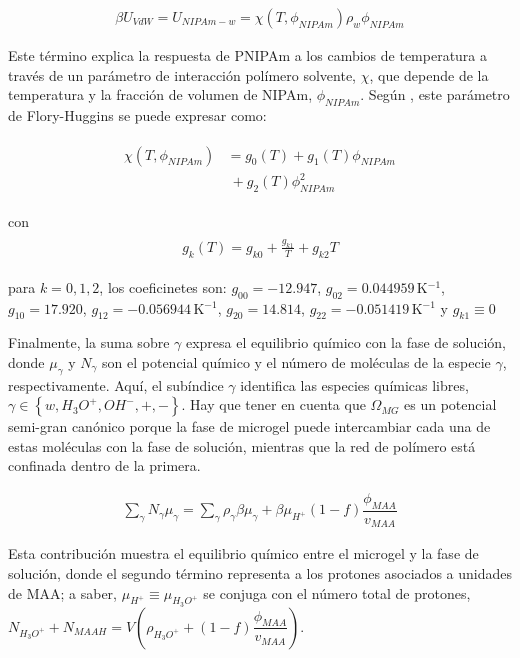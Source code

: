 \begin{align}
	\beta U_{VdW} = U_{NIPAm-w} = \chi (T, \phi_{NIPAm})\rho_w \phi_{NIPAm}
\end{align}


Este  t\'ermino explica la respuesta de PNIPAm a los cambios de temperatura a trav\'es de un par\'ametro de interacci\'on pol\'imero solvente, $\chi$, que depende de la temperatura y la fracci\'on de volumen de NIPAm, $\phi_{NIPAm}$.
Seg\'un  \citet{afroze2000}, este par\'ametro de Flory-Huggins se puede expresar como:
%
%


\begin{align}
	\begin{aligned}
		\chi (T, \phi_{NIPAm}) &=g_0(T) +g_1(T)\phi_{NIPAm} \\
		&~+ g_2(T)\phi_{NIPAm}^2
	\end{aligned}
\end{align}

\noindent con
%
%
\begin{align}
	\begin{aligned} 
		g_k(T)=g_{k0} + \frac{g_{k1}}{T} + g_{k2}T
	\end{aligned}
\end{align}


\noindent para  $k=0,1,2$, los coeficinetes son: $g_{00}= -12.947$, $g_{02}=0.044959\,$K$^{-1}$, $g_{10}= 17.920$, $g_{12}= -0.056944$\,K$^{-1}$, $g_{20}= 14.814$, $g_{22}= -0.051419$\,K$^{-1}$  y $g_{k1}\equiv 0$ \cite{afroze2000}




Finalmente, la suma sobre  $\gamma$ expresa el equilibrio qu\'imico con la fase de soluci\'on, donde $\mu_\gamma$ y $N_\gamma$ son el potencial qu\'imico y el n\'umero de mol\'eculas de la especie $\gamma$, respectivamente.
Aqu\'i, el subíndice $\gamma$ identifica  las especies qu\'imicas libres, $\gamma \in \left\{ w, H_3O^+, OH^-, +,- \right\}$.
Hay que tener en cuenta que $\Omega_{MG}$ es un potencial semi-gran can\'onico porque la fase de microgel puede intercambiar cada una de estas mol\'eculas con la fase de soluci\'on, mientras que la red de pol\'imero está confinada dentro de la primera.


\begin{align}
	\sum_\gamma N_\gamma \mu_\gamma = \sum_{\gamma }{\rho_\gamma\beta\mu_\gamma}
	+ \beta\mu_{H^+}(1-f)\dfrac{\phi_{MAA}}{v_{MAA}}
\end{align}

Esta contribuci\'on muestra el equilibrio qu\'imico entre el microgel y la fase de soluci\'on, donde el segundo t\'ermino representa a los protones asociados a unidades de MAA;
a saber, $\mu_{H^+}\equiv\mu_{H_3O^+}$ se conjuga con el n\'umero total de protones,
$N_{H_3O^+}+N_{MAAH}=V\left(\rho_{H_3O^+}+(1-f)\dfrac{\phi_{MAA}}{v_{MAA}}\right)$.


